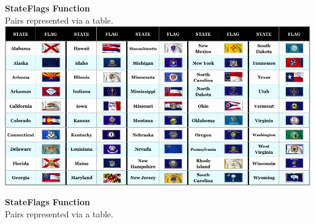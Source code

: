 \documentclass{ximera}
\begin{document}
\begin{center}
\textbf{StateFlags Function} \\
Pairs represented via a table. \\

\includegraphics{pics/allStateFlags.png}
\end{center}







\begin{center}
\textbf{StateFlags Function} \\
Pairs represented via a table.
\end{center}
\end{document}
